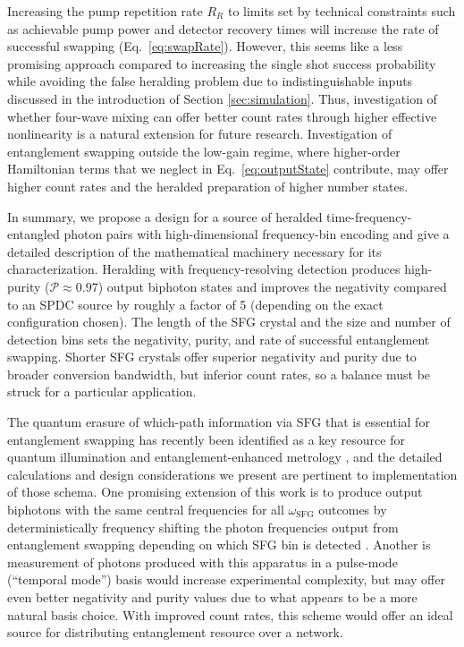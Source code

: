\documentclass[twocolumn,amssymb, nobibnotes, showpacs, aps, pra,10pt]{revtex4-1}
\newcommand*{\wsfg}{\omega_\textrm{SFG}}
\begin{document}
Increasing the pump repetition rate $R_R$ to limits set by technical constraints such as achievable pump power and detector recovery times will increase the rate of successful swapping (Eq.\ \eqref{eq:swapRate}). However, this seems like a less promising approach compared to increasing the single shot success probability while avoiding the false heralding problem due to indistinguishable inputs discussed in the introduction of Section \ref{sec:simulation}. Thus, investigation of whether four-wave mixing can offer better count rates through higher effective nonlinearity is a natural extension for future research.  Investigation of entanglement swapping outside the low-gain regime, where higher-order Hamiltonian terms that we neglect in Eq.\ \eqref{eq:outputState} contribute, may offer higher count rates and the heralded preparation of higher number states.

In summary, we propose a design for a source of heralded time-frequency-entangled photon pairs with high-dimensional frequency-bin encoding and give a detailed description of the mathematical machinery necessary for its characterization. Heralding with frequency-resolving detection produces high-purity ($\mathcal{P} \approx 0.97$) output biphoton states and improves the negativity compared to an SPDC source by roughly a factor of 5 (depending on the exact configuration chosen). The length of the SFG crystal and the size and number of detection bins sets the negativity, purity, and rate of successful entanglement swapping. Shorter SFG crystals offer superior negativity and purity due to broader conversion bandwidth, but inferior count rates, so a balance must be struck for a particular application.

The quantum erasure of which-path information via SFG that is essential for entanglement swapping has recently been identified as a key resource for quantum illumination and entanglement-enhanced metrology \cite{Lloyd08,zhuang17a, zhuang17b}, and the detailed calculations and design considerations we present are pertinent to implementation of those schema. One promising extension of this work is to produce output biphotons with the same central frequencies for all $\wsfg$ outcomes by deterministically frequency shifting the photon frequencies output from entanglement swapping depending on which SFG bin is detected \cite{Wright2017}. Another is measurement of photons produced with this apparatus in a pulse-mode (``temporal mode'') basis \cite{Reddy2015} would increase experimental complexity, but may offer even better negativity and purity values due to what appears to be a more natural basis choice. With improved count rates, this scheme would offer an ideal source for distributing entanglement resource over a network.
\end{document}
